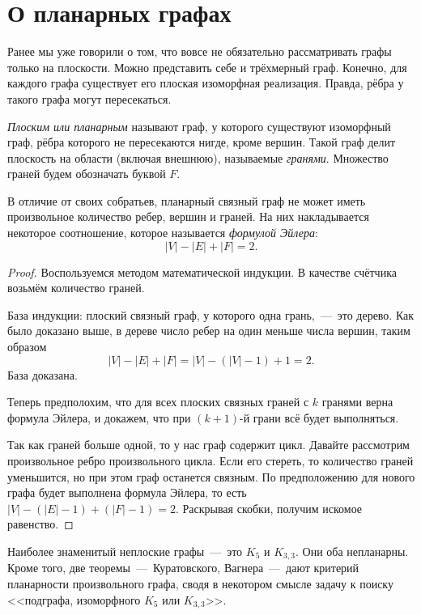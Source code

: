 \newpage
\section{О планарных графах}

Ранее мы уже говорили о том, что вовсе не обязательно рассматривать графы только на плоскости. Можно представить себе и трёхмерный граф. Конечно, для каждого графа существует его плоская изоморфная реализация. Правда, рёбра у такого графа могут пересекаться.

\begin{definition}
	\emph{Плоским или планарным} называют граф, у которого существуют изоморфный граф, рёбра которого не пересекаются нигде, кроме вершин. Такой граф делит плоскость на области (включая внешнюю), называемые \emph{гранями}. Множество граней будем обозначать буквой $F$.
\end{definition}


	В отличие от своих собратьев, планарный связный граф не может иметь произвольное количество ребер, вершин и граней. На них накладывается некоторое соотношение, которое называется \emph{формулой Эйлера}: $$|V| - |E| + |F| = 2.$$

\begin{proof}
	Воспользуемся методом математической индукции. В качестве счётчика возьмём количество граней.

	База индукции: плоский связный граф, у которого одна грань,~---~это дерево. Как было доказано выше, в дереве число ребер на один меньше числа вершин, таким образом 
$$|V| - |E| + |F| = |V| - (|V| - 1) + 1 = 2.$$
	База доказана.
	
	Теперь предполохим, что для всех плоских связных граней с $k$ гранями верна формула Эйлера, и докажем, что при $(k+1)$-й грани всё будет выполняться.
	
	Так как граней больше одной, то у нас граф содержит цикл. Давайте рассмотрим произвольное ребро произвольного цикла. Если его стереть, то количество граней уменьшится, но при этом граф останется связным. По предположению для нового графа будет выполнена формула Эйлера, то есть $|V| - (|E| - 1) + (|F| - 1) = 2$. Раскрывая скобки, получим искомое равенство.
\end{proof}
	

	Наиболее знаменитый неплоские графы~---~это $K_5$ и $K_{3,3}$. Они оба непланарны. Кроме того, две теоремы~---~Куратовского, Вагнера~---~дают критерий планарности произвольного графа, сводя в некотором смысле задачу к поиску <<подграфа, изоморфного $K_5$ или $K_{3,3}$>>.
	
